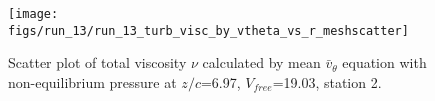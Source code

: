 \begin{figure}[H]
\centering
\texttt{[image: figs/run\_13/run\_13\_turb\_visc\_by\_vtheta\_vs\_r\_meshscatter]}
\caption{Scatter plot of total viscosity $\nu$ calculated by mean $\bar{v}_{\theta}$ equation with non-equilibrium pressure at $z/c$=6.97, $V_{free}$=19.03, station 2.}
\label{fig:run_13_turb_visc_by_vtheta_vs_r_meshscatter}
\end{figure}


